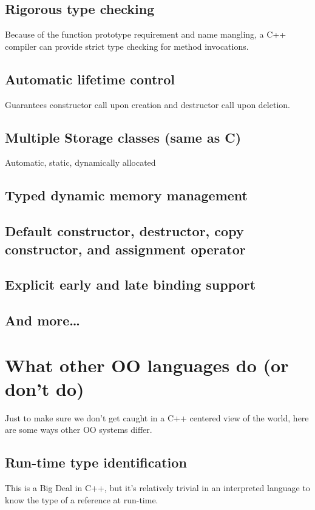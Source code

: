 \subsection{Rigorous type checking}
Because of the function prototype requirement and name mangling, a C++
compiler can provide strict type checking for method invocations.


\subsection{Automatic lifetime control}
Guarantees constructor call upon creation and destructor call upon
deletion.


\subsection{Multiple Storage classes (same as C)}
Automatic, static, dynamically allocated


\subsection{Typed dynamic memory management}


\subsection{Default constructor, destructor, copy constructor, and assignment operator}


\subsection{Explicit early and late binding support}


\subsection{And more…}


\section{What other OO languages do (or don’t do)}
Just to make sure we don’t get caught in a C++ centered view of the
world, here are some ways other OO systems differ.


\subsection{Run-time type identification}
This is a Big Deal in C++, but it’s relatively trivial in an interpreted
language to know the type of a reference at run-time.


